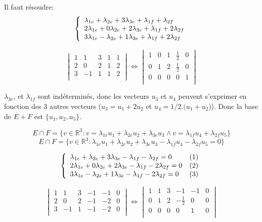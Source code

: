 \documentclass[]{book}
\theoremstyle{definition}
\newcommand{\bb}[1]{\mathbb{#1}}
\newcommand{\R}{\bb{R}}
\begin{document}
Il faut r\'esoudre:
$$
\left\{ 
\begin{array}{l l}
\lambda_{1e} + \lambda_{2e} + 3\lambda_{3e} + \lambda_{1f} + \lambda_{2f}\\
2\lambda_{1e} + 0\lambda_{2e} + 2\lambda_{3e} + \lambda_{1f} + 2\lambda_{2f}\\
3\lambda_{1e} - \lambda_{2e} + 1\lambda_{3e} + \lambda_{1f} + 2\lambda_{2f}\\
\end{array}
\right. 
$$ 


$$
\begin{vmatrix}
1 & 1  & 3 & 1 & 1 \\
2 & 0  & 2 & 1 & 2 \\
3 & -1 & 1 & 1 & 2 \\
\end{vmatrix}
\Leftrightarrow
\begin{vmatrix}
1 & 0  & 1 & \frac{1}{2} & 0 \\
0 & 1  & 2 & \frac{1}{2} & 0 \\
0 & 0 & 0 & 0 & 1 \\
\end{vmatrix}
$$


$\lambda_{3e}$, et $\lambda_{1f}$ sont ind\'etermin\'es, donc les vecteurs $u_3$ et $u_4$ peuvent s'exprimer en fonction des 3 autres vecteurs ($u_3 = u_1 + 2u_2$ et $u_4 = 1/2.(u_1 + u_2$)). Donc la base de $E+F$ est $\{u_1, u_2, u_5\}$.


$$E \cap F = \{v \in \R^3: v = \lambda_{1e}u_1 + \lambda_{2e}u_2 + \lambda_{3e}u_3 \land v = \lambda_{1f}u_4 + \lambda_{2f}u_5\}$$  
$$E \cap F = \{v \in \R^3: \lambda_{1e}u_1 + \lambda_{2e}u_2 + \lambda_{3e}u_3 - \lambda_{1f}u_4 - \lambda_{2f}u_5 = 0\}$$  

$$
\left\{ 
\begin{array}{l l}
\lambda_{1e} + \lambda_{2e} + 3\lambda_{3e} - \lambda_{1f} - \lambda_{2f} = 0 & (1)\\
2\lambda_{1e} + 0\lambda_{2e} + 2\lambda_{3e} - \lambda_{1f} - 2\lambda_{2f} = 0 & (2)\\
3\lambda_{1e} - \lambda_{2e} + 1\lambda_{3e} - \lambda_{1f} - 2\lambda_{2f} = 0 & (3)\\
\end{array}
\right. 
$$ 

$$
\begin{vmatrix}
1 & 1  & 3 & -1 & -1 & 0\\
2 & 0  & 2 & -1 & -2 & 0\\
3 & -1 & 1 & -1 & -2 & 0\\
\end{vmatrix}
\Leftrightarrow
\begin{vmatrix}
1 & 1  & 3 & -1 & -1  & 0\\
0 & 1  & 2 & -\frac{1}{2} & 0 & 0\\
0 & 0 & 0 & 0 & 1 & 0\\
\end{vmatrix}
$$
\end{document}
